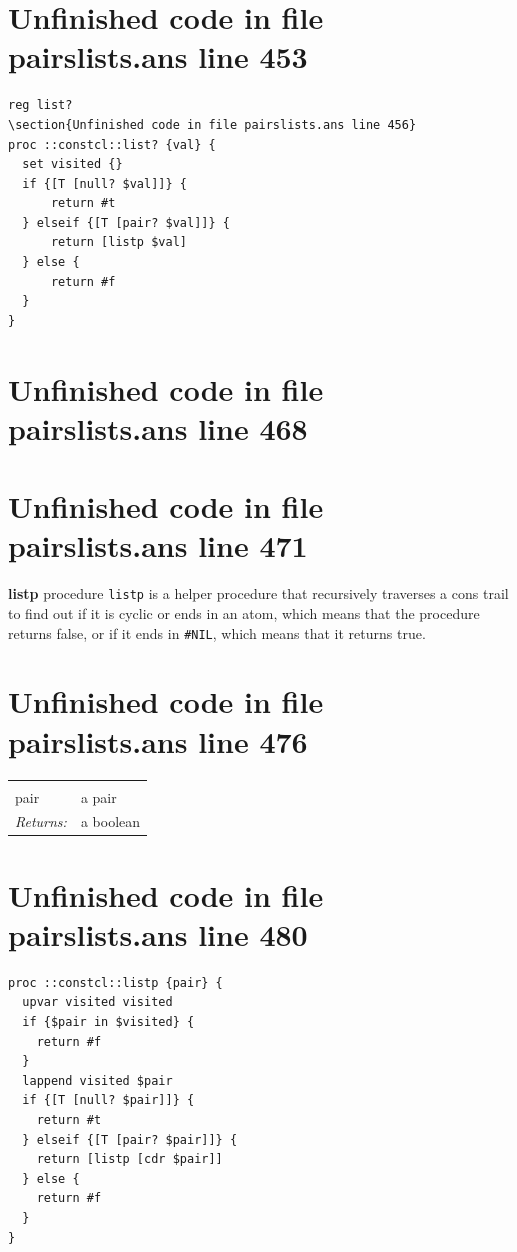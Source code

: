 \documentclass[twoside,9pt]{report}
\begin{document}
\section{Unfinished code in file pairslists.ans line 453}
\begin{lstlisting}
reg list?
\section{Unfinished code in file pairslists.ans line 456}
proc ::constcl::list? {val} {
  set visited {}
  if {[T [null? $val]]} {
      return #t
  } elseif {[T [pair? $val]]} {
      return [listp $val]
  } else {
      return #f
  }
}
\end{lstlisting}
\section{Unfinished code in file pairslists.ans line 468}

\section{Unfinished code in file pairslists.ans line 471}

\textbf{listp} procedure \texttt{listp} is a helper procedure that recursively traverses a cons trail to find out if it is cyclic or ends in an atom, which means that the procedure returns false, or if it ends in \texttt{\#NIL}, which means that it returns true.

\section{Unfinished code in file pairslists.ans line 476}
\noindent\begin{tabular}{ |p{1.9cm} p{8cm}| }
\hline
\rowcolor[HTML]{CCCCCC} \multicolumn{2}{|l|}{\bf listp (internal)} \\
pair & a pair \\
\textit{Returns:} & a boolean \\
\hline
\end{tabular}
\section{Unfinished code in file pairslists.ans line 480}
\begin{lstlisting}
proc ::constcl::listp {pair} {
  upvar visited visited
  if {$pair in $visited} {
    return #f
  }
  lappend visited $pair
  if {[T [null? $pair]]} {
    return #t
  } elseif {[T [pair? $pair]]} {
    return [listp [cdr $pair]]
  } else {
    return #f
  }
}
\end{lstlisting}
\end{document}
